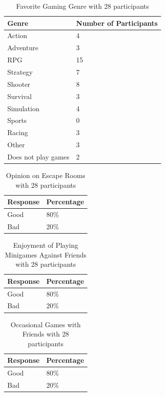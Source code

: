 \documentclass{article}
\begin{document}
\begin{longtable}[]{@{}ll@{}}
\caption{Favorite Gaming Genre with 28 participants} \label{favorite-gaming-genre} \\
\toprule\noalign{}
Genre & Number of Participants \\
\midrule\noalign{}
\endhead
\bottomrule\noalign{}
\endlastfoot
Action & 4 \\
Adventure & 3 \\
RPG & 15 \\
Strategy & 7 \\
Shooter & 8 \\
Survival & 3 \\
Simulation & 4 \\
Sports & 0 \\
Racing & 3 \\
Other & 3 \\
Does not play games & 2 \\
\end{longtable}

\begin{longtable}[]{@{}ll@{}}
\caption{Opinion on Escape Rooms with 28 participants} \label{opinion-on-escape-rooms} \\
\toprule\noalign{}
Response & Percentage \\
\midrule\noalign{}
\endhead
\bottomrule\noalign{}
\endlastfoot
Good & 80\% \\
Bad & 20\% \\
\end{longtable}

\begin{longtable}[]{@{}ll@{}}
\caption{Enjoyment of Playing Minigames Against Friends with 28 participants} \label{enjoyment-of-playing-minigames-against-friends} \\
\toprule\noalign{}
Response & Percentage \\
\midrule\noalign{}
\endhead
\bottomrule\noalign{}
\endlastfoot
Good & 80\% \\
Bad & 20\% \\
\end{longtable}

\begin{longtable}[]{@{}ll@{}}
\caption{Occasional Games with Friends with 28 participants} \label{occasional-games-with-friends} \\
\toprule\noalign{}
Response & Percentage \\
\midrule\noalign{}
\endhead
\bottomrule\noalign{}
\endlastfoot
Good & 80\% \\
Bad & 20\% \\
\end{longtable}
\end{document}

